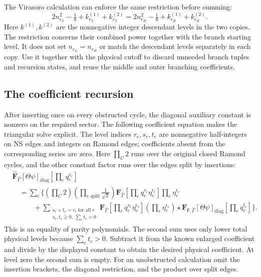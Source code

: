 \documentclass[11pt]{article}
\newcommand{\F}{\mathsf F}
\numberwithin{equation}{section}
\begin{document}
The Virasoro calculation can enforce the same restriction before summing:
\begin{equation}
 2n_{e_L}^2-\tfrac18+k_{e_L}^{(1)}+k_{e_L}^{(2)}
 =2n_{e_R}^2-\tfrac18+k_{e_R}^{(1)}+k_{e_R}^{(2)}.
 \label{eq:diagonal-cutoff}
\end{equation}
Here $k^{(1)},k^{(2)}$ are the nonnegative integer descendant levels in
the two copies. The restriction concerns their combined power together
with the branch starting level. It does not set $n_{e_L}=n_{e_R}$ or
match the descendant levels separately in each copy. Use it together with
the physical cutoff to discard unneeded branch tuples and recursion
states, and reuse the middle and outer branching coefficients.

\subsection{The coefficient recursion}

After inserting once on every obstructed cycle, the diagonal auxiliary
constant is nonzero on the required sector. The following coefficient
equation makes the triangular solve explicit. The level indices $r_e,s_e,t_e$ are
nonnegative half-integers on NS edges and integers on Ramond edges;
coefficients absent from the corresponding series are zero. Here
$\prod_C2$ runs over the original closed Ramond cycles, and the other
constant factor runs over the edges split by insertions:
\begin{align}
 &\widehat{\mathbf F}_{\hat\Gamma}[\Theta\psi]_{\mathrm{diag}}
                    \left[\prod_e q_e^{r_e}\right]
 \nonumber\\
 &\quad=\sum_{\epsilon}\Bigg\{
     \left(\prod_C2\right)\left(\prod_{e\text{ split}}\frac1{\sqrt2}\right)
     \mathbf F_{\hat\Gamma}
                    \left[\prod_e q_e^{r_e}\eta_e^{\epsilon_e}\right]
     \prod_e\eta_e^{\epsilon_e}
 \nonumber\\
 &\qquad\quad+
 \sum_{\substack{s_e+t_e=r_e\ \text{for all }e\\s_e,t_e\ge0,\ \sum_e t_e>0}}
     \mathbf F_{\hat\Gamma}
                    \left[\prod_e q_e^{s_e}\eta_e^{\epsilon_e}\right]
     \left(\prod_e\eta_e^{\epsilon_e}\right)\star
     \mathbf F_{\F,\hat\Gamma}[\Theta\psi]_{\mathrm{diag}}
                    \left[\prod_e q_e^{t_e}\right]\Bigg\}.
 \label{eq:recovery}
\end{align}
This is an equality of parity polynomials. The second sum uses only lower
total physical levels because $\sum_e t_e>0$. Subtract it from the known
enlarged coefficient and divide by the displayed constant to obtain
the desired physical coefficient. At level zero the second sum is empty. For an unobstructed
calculation omit the insertion brackets, the diagonal restriction, and
the product over split edges.
\end{document}
